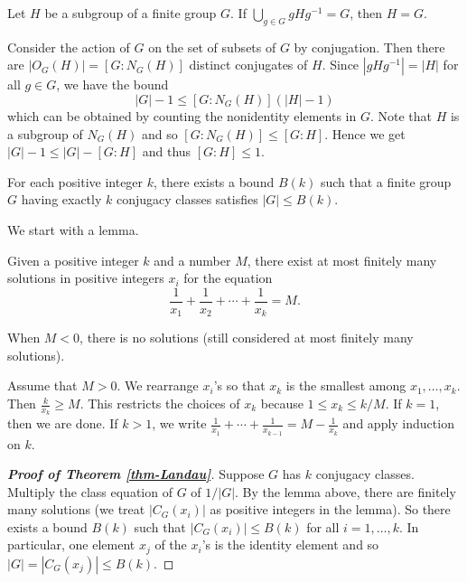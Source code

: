 \begin{remark}
\begin{corollary}
	Let $H$ be a subgroup of a finite group $G$. If $\bigcup_{g\in G}gHg^{-1} = G$, then $H = G$.
\end{corollary}
\begin{sketch}
	Consider the action of $G$ on the set of subsets of $G$ by conjugation. Then there are $|O_G(H)| = [G:N_G(H)]$ distinct conjugates of $H$. Since $|gHg^{-1}| = |H|$ for all $g\in G$, we have the bound
	$$|G|-1\leq [G:N_G(H)](|H|-1)$$
	which can be obtained by counting the nonidentity elements in $G$. Note that $H$ is a subgroup of $N_G(H)$ and so $[G:N_G(H)]\leq [G:H]$. Hence we get $|G|-1\leq |G| - [G:H]$ and thus $[G:H]\leq 1$.
\end{sketch}

\begin{theorem}[Landau] \label{thm-Landau}
	For each positive integer $k$, there exists a bound $B(k)$ such that a finite group $G$ having exactly $k$ conjugacy classes satisfies $|G|\leq B(k)$.
\end{theorem}
We start with a lemma.
\begin{lemma}
	Given a positive integer $k$ and a number $M$, there exist at most finitely many solutions in positive integers $x_i$ for the equation
	$$\frac{1}{x_1}+ \frac{1}{x_2} + \cdots + \frac{1}{x_k} = M.$$
\end{lemma}
\begin{sketch}
	When $M<0$, there is no solutions (still considered at most finitely many solutions).
	
	Assume that $M>0$. We rearrange $x_i$'s so that $x_k$ is the smallest among $x_1,\dots, x_k$. Then $\frac{k}{x_k}\geq M$. This restricts the choices of $x_k$ because $1\leq x_k \leq k/M$. If $k =1$, then we are done. If $k>1$, we write $\frac{1}{x_1} + \cdots + \frac{1}{x_{k-1}} = M - \frac{1}{x_k}$ and apply induction on $k$.
\end{sketch}
\begin{proof}[\textbf{Proof of Theorem \ref{thm-Landau}}]
	Suppose $G$ has $k$ conjugacy classes. Multiply the class equation of $G$ of $1/|G|$. By the lemma above, there are finitely many solutions (we treat $|C_G(x_i)|$ as positive integers in the lemma). So there exists a bound $B(k)$ such that $|C_G(x_i)|\leq B(k)$ for all $i = 1,\dots, k$. In particular, one element $x_j$ of the $x_i$'s is the identity element and so $|G| = |C_G(x_j)|\leq B(k)$.
\end{proof}


\end{remark}

